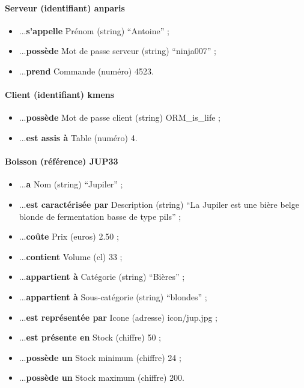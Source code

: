 

\paragraph{Serveur (identifiant) anparis}
\begin{itemize}
	\item ...\textbf{s'appelle} Prénom (string) ``Antoine'' ;
	\item ...\textbf{possède} Mot de passe serveur (string) ``ninja007'' ;
	\item ...\textbf{prend} Commande (numéro) 4523.
\end{itemize}

\paragraph{Client (identifiant) kmens}
\begin{itemize}
	\item ...\textbf{possède} Mot de passe client (string) ORM\_is\_life ;
	\item ...\textbf{est assis à} Table (numéro) 4.
\end{itemize}

\paragraph{Boisson (référence) JUP33}
\begin{itemize}		
	\item ...\textbf{a} Nom (string) ``Jupiler'' ;
	\item ...\textbf{est caractérisée par} Description (string)
	``La Jupiler est une bière belge blonde de fermentation
	basse de type pils'' ;
	\item ...\textbf{coûte} Prix (euros) 2.50 ;
	\item ...\textbf{contient} Volume (cl) 33 ;
	\item ...\textbf{appartient à} Catégorie (string) ``Bières'' ;
	\item ...\textbf{appartient à} Sous-catégorie (string) ``blondes'' ;
	\item ...\textbf{est représentée par} Icone (adresse) icon/jup.jpg ;
	\item ...\textbf{est présente en} Stock (chiffre) 50 ;
	\item ...\textbf{possède un} Stock minimum (chiffre) 24 ;
	\item ...\textbf{possède un} Stock maximum (chiffre) 200.
\end{itemize}

